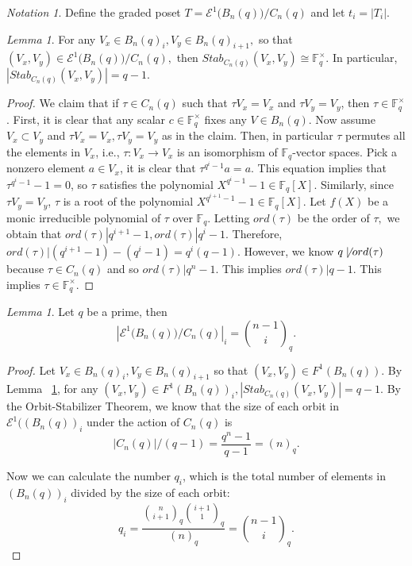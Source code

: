\documentclass[10 pt]{amsart}
\theoremstyle{plain}
\theoremstyle{definition}
\theoremstyle{remark}
\numberwithin{equation}{section}
\newtheorem{lem}[thm]{Lemma}
\theoremstyle{remark}
\newtheorem{note}[thm]{Notation}
\newcommand\BF{{\mathbb F}}
\begin{document}
\begin{note}
Define the graded poset $T = \mathcal E^1 \big(B_n(q)\big)/C_n(q)$ and let $t_i = |T_i|.$
\end{note}

\begin{lem}
\label{lem:q_stabilizer}
For any $V_x \in B_n(q)_i,V_y \in B_n(q)_{i+1},$ so that $(V_x, V_y) \in \mathcal E^1 \big(B_n(q)\big)/C_n(q),$ then $Stab_{C_n(q)}(V_x , V_y) \cong \BF_q^\times.$ In particular, $|Stab_{C_n(q)}(V_x , V_y)|=q-1.$ 
\end{lem}
\begin{proof}

We claim that if $\tau \in C_n(q)$ such that $\tau V_x = V_x$ and $\tau V_y = V_y$, then $\tau \in \BF_q^\times$. First, it is clear that any scalar $c \in \BF_q^\times$  fixes any $V \in B_n(q)$. Now assume $V_x \subset V_y$ and $\tau V_x = V_x, \tau V_y = V_y$ as in the claim. Then, in particular $\tau$ permutes all the elements in $V_x$, i.e., $\tau: V_x \rightarrow V_x$ is an isomorphism of $\BF_q$-vector spaces. Pick a nonzero element $a \in V_x$, it is clear that $\tau^{q^i-1} a = a.$ This equation implies that $\tau^{q^i-1} - 1 = 0$, so $\tau$ satisfies the polynomial $X^{q^{i}-1} - 1 \in \BF_q[X]$. Similarly, since $\tau V_y = V_y$, $\tau$ is a root of the polynomial $X^{q^{i+1}-1} - 1 \in\BF_q[X].$  
Let $f(X)$ be a monic irreducible polynomial of $\tau$ over $\BF_q$. 
Letting $ord(\tau)$ be the order of $\tau,$ we obtain that $ord(\tau)|q^{i+1}-1,ord(\tau)|q^i -1.$ 
Therefore, $ord(\tau)|(q^{i+1}-1)-(q^i-1) = q^i(q-1)$. 
However, we know $q \not \mid ord(\tau)$ because $\tau \in C_n(q)$ and so $ord(\tau)|q^n-1.$ This implies $ord(\tau)|q-1.$ This implies $\tau \in \BF_q^\times.$

\end{proof}

\begin{lem} 
\label{lem:cyclic_q_analog_ranks}
Let $q$ be a prime,  then $$ |\mathcal E^1 \big(B_n(q)\big)/C_n(q)|_{i} = {n-1 \choose i}_q.$$
\end{lem}

\begin{proof}

Let $V_x \in B_n(q)_i,V_y \in B_n(q)_{i+1}$ so that $(V_x, V_y) \in F^1 (B_n(q))$. By Lemma ~\ref{lem:q_stabilizer}, for any $(V_x, V_y) \in F^1 (B_n(q))_i,|Stab_{C_n(q)}(V_x, V_y)|=q-1.$  By the Orbit-Stabilizer Theorem, we know that the size of each orbit in $\mathcal E^1 ((B_n(q))_i$ under the action of $C_n(q)$ is $$|C_n(q)|/(q-1) = \frac{q^n-1}{q-1} = (n)_q.$$

Now we can calculate the number $q_i$, which is the total number of elements in $(B_n(q))_i$ divided by the size of each orbit:$$q_i = \frac{{n \choose i+1}_q {i+1 \choose 1}_q}{(n)_q} = {n-1 \choose i}_q. $$
\end{proof}
\end{document}
